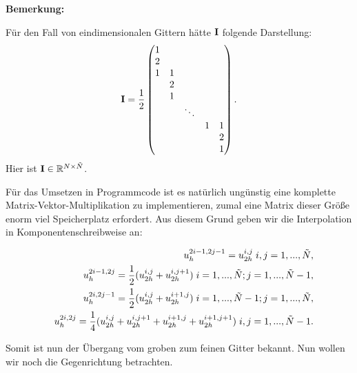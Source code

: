 \textbf{Bemerkung:}

Für den Fall von eindimensionalen Gittern hätte ${\textbf{I}}$ folgende Darstellung:
\begin{equation}
{\textbf{I}} = \frac {1} {2}
\begin{pmatrix}
1\\
2\\
1 & 1\\
  & 2\\
  & 1\\
  &   & \ddots\\
  &   &          & 1 & 1\\
  &   &          &   & 2\\
  &   &          &   & 1
\end{pmatrix}.
\end{equation}
Hier ist ${\textbf{I}} \in \mathbb{R}^{N \times \tilde N}$.

\label{img.Prolongation}

Für das Umsetzen in Programmcode ist es natürlich ungünstig eine komplette Matrix-Vektor-Multiplikation zu implementieren, zumal eine Matrix dieser Größe enorm viel Speicherplatz erfordert. Aus diesem Grund geben wir die Interpolation in Komponentenschreibweise an:

\begin{eqnarray}
&&u_{h}^{2i-1,2j-1} = u_{2h}^{i,j} \hspace{0.1cm} i,j = 1,...,\tilde N, \\
&&u_{h}^{2i-1,2j} = \frac{1}{2} (u_{2h}^{i,j} + u_{2h}^{i,j+1}) \hspace{0.1cm} i = 1,...,\tilde N; j = 1,...,\tilde N - 1, \\
&&u_{h}^{2i,2j-1} = \frac{1}{2} (u_{2h}^{i,j} + u_{2h}^{i+1,j}) \hspace{0.1cm} i = 1,...,\tilde N - 1; j = 1,...,\tilde N, \\
&&u_{h}^{2i,2j} = \frac{1}{4} (u_{2h}^{i,j} + u_{2h}^{i,j+1} + u_{2h}^{i+1,j} + u_{2h}^{i+1,j+1}) \hspace{0.1cm} i,j = 1,...,\tilde N - 1.
\end{eqnarray}

Somit ist nun der Übergang vom groben zum feinen Gitter bekannt. Nun wollen wir noch die Gegenrichtung betrachten.

